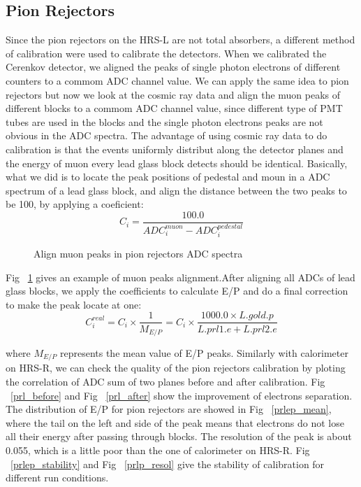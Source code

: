 \clearpage

\subsection{Pion Rejectors}
Since the pion rejectors on the HRS-L are not total absorbers, a different method of calibration were used to calibrate the detectors. When we calibrated the Cerenkov detector, we aligned the peaks of single photon electrons of different counters to a commom ADC channel value. We can apply the same idea to pion rejectors but now we look at the cosmic ray data and align the muon peaks of different blocks to a commom ADC channel value, since different type of PMT tubes are used in the blocks and the single photon electrons peaks are not obvious in the ADC spectra. The advantage of using cosmic ray data to do calibration is that the events uniformly distribut along the detector planes and the energy of muon every lead glass block detects should be identical. Basically, what we did is to locate the peak positions of pedestal and moun in a ADC spectrum of a lead glass block, and align the distance between the two peaks to be 100, by applying a coeficient:
\begin{equation}
 C_{i} = \frac{100.0}{ADC_{i}^{muon}-ADC_{i}^{pedestal}}
\end{equation}

\begin{figure}[htb]
\centerline{}
\caption[Align muon peaks in pion rejectors ADC spectra]{\footnotesize{Align muon peaks in pion rejectors ADC spectra}
\label{prl1_align}}
\end{figure}

 Fig ~\ref{prl1_align} gives an example of muon peaks alignment.After aligning all ADCs of lead glass blocks, we apply the coefficients to calculate E/P and do a final correction to make the peak locate at one:
\begin{equation}
 C_{i}^{real} = C_{i} \times \frac{1}{M_{E/P}} = C_{i} \times \frac{1000.0 \times L.gold.p}{L.prl1.e+L.prl2.e}
\end{equation}

where $M_{E/P}$ represents the mean value of E/P peaks. Similarly with calorimeter on HRS-R, we can check the quality of the pion rejectors calibration by ploting the correlation of ADC sum of two planes before and after calibration. Fig ~\ref{prl_before} and Fig ~\ref{prl_after} show the improvement of electrons separation. The distribution of E/P for pion rejectors are showed in Fig ~\ref{prlep_mean}, where the tail on the left and side of the peak means that electrons do not lose all their energy after passing through blocks. The resolution of the peak is about 0.055, which is a little poor than the one of calorimeter on HRS-R. Fig ~\ref{prlep_stability} and Fig ~\ref{prlp_resol} give the stability of calibration for different run conditions.

